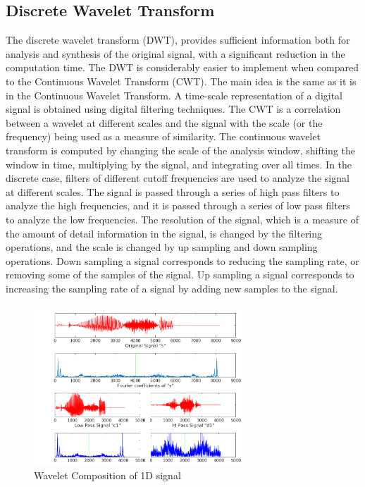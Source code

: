 \documentclass[a4paper,12pt]{article}
\begin{document}
\subsection{Discrete Wavelet Transform}
The discrete wavelet transform (DWT), provides sufficient information both for analysis and synthesis of the original signal, with a significant reduction in the computation time. The DWT is considerably easier to implement when compared to the Continuous Wavelet Transform (CWT). The main idea is the same as it is in the Continuous Wavelet Transform. A time-scale representation of a digital signal is obtained using digital filtering techniques. The CWT is a correlation between a wavelet at different scales and the signal with the scale (or the frequency) being used as a measure of similarity. The continuous wavelet transform is computed by changing the scale of the analysis window, shifting the window in time, multiplying by the signal, and integrating over all times. In the discrete case, filters of different cutoff frequencies are used to analyze the signal at different scales. The signal is passed through a series of high pass filters to analyze the high frequencies, and it is passed through a series of low pass filters to analyze the low frequencies. The resolution of the signal, which is a measure of the amount of detail information in the signal, is changed by the filtering operations, and the scale is changed by up sampling and down sampling operations. Down sampling a signal corresponds to reducing the sampling rate, or removing some of the samples of the signal. Up sampling a signal corresponds to increasing the sampling rate of a signal by adding new samples to the signal.

\begin{figure}[t]
        \centering
        \includegraphics[width=8cm]{../Results/demo_1D_composition}
        \caption{Wavelet Composition of 1D signal}
		\label{fig:demo1}
\end{figure}
\end{document}

